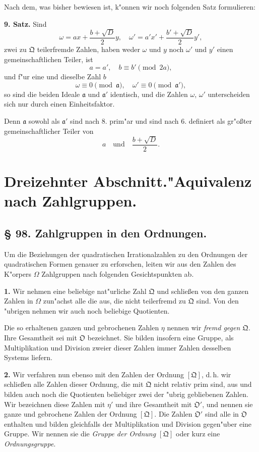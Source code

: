 \documentclass[12pt,a4paper]{article}
\theoremstyle{plain}
\begin{document}
Nach dem, was bisher bewiesen ist, k"onnen wir noch folgenden Satz formulieren:

\textbf{9. Satz.} Sind
\[
\omega = ax + \frac{b + \sqrt{D}}{2}y,\quad \omega' = a'x' + \frac{b' + \sqrt{D}}{2}y',
\]
zwei zu $\mathfrak{Q}$ teilerfremde Zahlen, haben weder $\omega$ und $y$ noch $\omega'$ und $y'$ einen gemeinschaftlichen Teiler, ist
\[
a = a',\quad b \equiv b' \pmod{2a},
\]
und f"ur eine und dieselbe Zahl $b$
\[
\omega \equiv 0 \pmod{\mathfrak{a}},\quad \omega' \equiv 0 \pmod{\mathfrak{a}'},
\]
so sind die beiden Ideale $\mathfrak{a}$ und $\mathfrak{a}'$ identisch, und die Zahlen $\omega$, $\omega'$ unterscheiden sich nur durch einen Einheitsfaktor.

Denn $\mathfrak{a}$ sowohl als $\mathfrak{a}'$ sind nach 8. prim"ar und sind nach 6. definiert als gr"o\ss ter gemeinschaftlicher Teiler von
\[
a\quad \text{und}\quad \frac{b + \sqrt{D}}{2}.
\]

\newpage
\section*{Dreizehnter Abschnitt.\quad "Aquivalenz nach Zahlgruppen.}

\subsection*{\S{} 98. Zahlgruppen in den Ordnungen.}

Um die Beziehungen der quadratischen Irrationalzahlen zu den Ordnungen der quadratischen Formen genauer zu erforschen, leiten wir aus den Zahlen des K"orpers $\Omega$ Zahlgruppen nach folgenden Gesichtspunkten ab.

\textbf{1.} Wir nehmen eine beliebige nat"urliche Zahl $\mathfrak{Q}$ und schlie\ss en von den ganzen Zahlen in $\Omega$ zun"achst alle die aus, die nicht teilerfremd zu $\mathfrak{Q}$ sind. Von den "ubrigen nehmen wir auch noch beliebige Quotienten.

Die so erhaltenen ganzen und gebrochenen Zahlen $\eta$ nennen wir \textit{fremd gegen $\mathfrak{Q}$}. Ihre Gesamtheit sei mit $\mathfrak{O}$ bezeichnet. Sie bilden insofern eine Gruppe, als Multiplikation und Division zweier dieser Zahlen immer Zahlen desselben Systems liefern.

\textbf{2.} Wir verfahren nun ebenso mit den Zahlen der Ordnung $[\mathfrak{Q}]$, d.\,h. wir schlie\ss en alle Zahlen dieser Ordnung, die mit $\mathfrak{Q}$ nicht relativ prim sind, aus und bilden auch noch die Quotienten beliebiger zwei der "ubrig gebliebenen Zahlen. Wir bezeichnen diese Zahlen mit $\eta'$ und ihre Gesamtheit mit $\mathfrak{O}'$, und nennen sie ganze und gebrochene Zahlen der Ordnung $[\mathfrak{Q}]$. Die Zahlen $\mathfrak{O}'$ sind alle in $\mathfrak{O}$ enthalten und bilden gleichfalls der Multiplikation und Division gegen"uber eine Gruppe. Wir nennen sie die \textit{Gruppe der Ordnung $[\mathfrak{Q}]$} oder kurz eine \textit{Ordnungsgruppe}.
\end{document}
